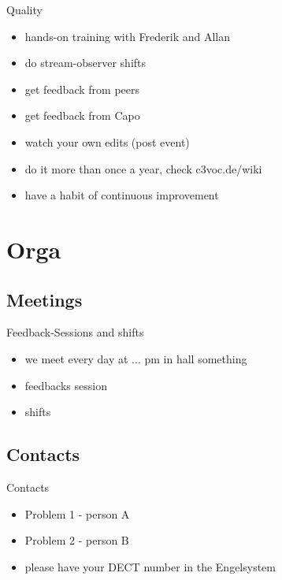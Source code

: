 \documentclass[hyperref={pdfpagelabels=false}]{beamer}
\begin{document}
\begin{frame}{Quality}
\begin{itemize} %
\item  hands-on training with Frederik and Allan %
\item do stream-observer shifts %
\item  get feedback from peers %
\item  get feedback from Capo %
\item  watch your own edits (post event) %
\item  do it more than once a year, check c3voc.de/wiki %
\item  have a habit of continuous improvement %
\end{itemize} 
\end{frame}

\section{Orga} 
\subsection{Meetings}
\begin{frame}{Feedback-Sessions and shifts}
\begin{itemize}
\item  we meet every day at ... pm in hall something
\item  feedbacks session
\item  shifts
\end{itemize} 
\end{frame}

\subsection{Contacts}
\begin{frame}{Contacts}
\begin{itemize}
\item  Problem 1 - person A
\item  Problem 2 - person B
\item  please have your DECT number in the Engelsystem
\end{itemize} 
\end{frame}
\end{document}
